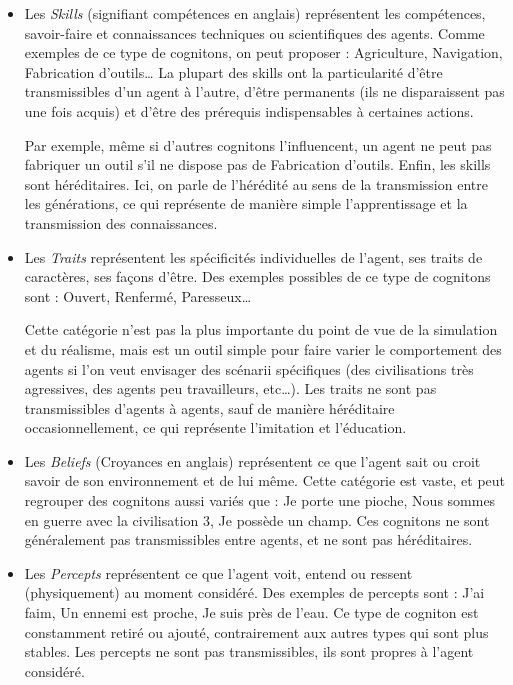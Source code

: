 \documentclass[a4paper,oneside,12 pt]{article}
\begin{document}
\begin{itemize}


\item 	Les\textit{ Skills} (signifiant compétences en anglais) représentent les compétences, savoir-faire et connaissances techniques ou scientifiques des agents. Comme exemples de ce type de cognitons, on peut proposer : Agriculture, Navigation, Fabrication d'outils… La plupart des skills ont la particularité d'être transmissibles d'un agent à l'autre, d'être permanents (ils ne disparaissent pas une fois acquis) et d'être des prérequis indispensables à certaines actions. 
	
	Par exemple, même si d'autres cognitons l'influencent, un agent ne peut pas fabriquer un outil s'il ne dispose pas de Fabrication d'outils. Enfin, les skills sont héréditaires. Ici, on parle de l'hérédité au sens de la transmission entre les générations, ce qui représente de manière simple l'apprentissage et la transmission des connaissances.

\item 	Les \textit{Traits} représentent les spécificités individuelles de l'agent, ses traits de caractères, ses façons d'être. Des exemples possibles de ce type de cognitons sont : Ouvert, Renfermé, Paresseux…
	
	Cette catégorie n'est pas la plus importante du point de vue de la simulation et du réalisme, mais est un outil simple pour faire varier le comportement des agents si l'on veut envisager des scénarii spécifiques (des civilisations très agressives, des agents peu travailleurs, etc…). Les traits ne sont pas transmissibles d'agents à agents, sauf de manière héréditaire occasionnellement, ce qui représente l'imitation et l'éducation.

\item 	Les \textit{Beliefs} (Croyances en anglais) représentent ce que l'agent sait ou croit savoir de son environnement et de lui même. Cette catégorie est vaste, et peut regrouper des cognitons aussi variés que : Je porte une pioche, Nous sommes en guerre avec la civilisation 3, Je possède un champ. Ces cognitons ne sont généralement pas transmissibles entre agents, et ne sont pas héréditaires.

\item 	Les \textit{Percepts} représentent ce que l'agent voit, entend ou ressent (physiquement) au moment considéré. Des exemples de percepts sont : J'ai faim, Un ennemi est proche, Je suis près de l'eau. Ce type de cogniton est constamment retiré ou ajouté, contrairement aux autres types qui sont plus stables. Les percepts ne sont pas transmissibles, ils sont propres à l'agent considéré.


\end{itemize}
\end{document}
